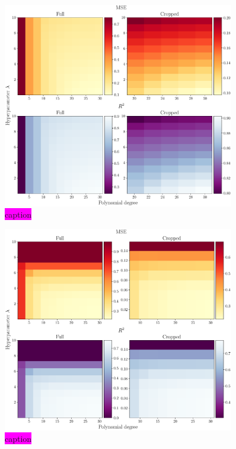 \documentclass[aps,pra,english,notitlepage,reprint,nofootinbib]{revtex4-1}  %
\begin{document}
\begin{figure}
  \vspace*{-5pt}
  \centering %
  \includegraphics[width=0.9\textwidth]{../figs/g_MSE_R2_Ridge.pdf}
  \caption{\colorbox{magenta}{caption}}\label{fig:g MSE R2 Ridge}
  \vspace*{-5pt}
\end{figure}

\begin{figure}
  \vspace*{-5pt}
  \centering %
  \includegraphics[width=0.9\textwidth]{../figs/g_MSE_R2_Lasso.pdf}
  \caption{\colorbox{magenta}{caption}}\label{fig:g MSE R2 Lasso}
  \vspace*{-5pt}
\end{figure}
\end{document}
